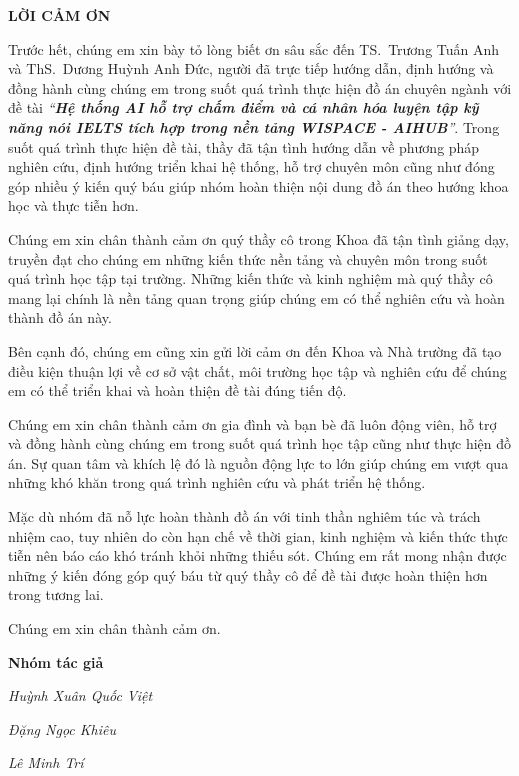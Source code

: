 \begin{center}
    \textbf{\Large LỜI CẢM ƠN}
\end{center}

Trước hết, chúng em xin bày tỏ lòng biết ơn sâu sắc đến TS.~Trương Tuấn Anh và ThS.~Dương Huỳnh Anh Đức, người đã trực tiếp hướng dẫn, định hướng và đồng hành cùng chúng em trong suốt quá trình thực hiện đồ án chuyên ngành với đề tài 
\textit{``\textbf{Hệ thống AI hỗ trợ chấm điểm và cá nhân hóa luyện tập kỹ năng nói IELTS tích hợp trong nền tảng WISPACE - AIHUB}''}. 
Trong suốt quá trình thực hiện đề tài, thầy đã tận tình hướng dẫn về phương pháp nghiên cứu, định hướng triển khai hệ thống, hỗ trợ chuyên môn cũng như đóng góp nhiều ý kiến quý báu giúp nhóm hoàn thiện nội dung đồ án theo hướng khoa học và thực tiễn hơn.

Chúng em xin chân thành cảm ơn quý thầy cô trong Khoa đã tận tình giảng dạy, truyền đạt cho chúng em những kiến thức nền tảng và chuyên môn trong suốt quá trình học tập tại trường. Những kiến thức và kinh nghiệm mà quý thầy cô mang lại chính là nền tảng quan trọng giúp chúng em có thể nghiên cứu và hoàn thành đồ án này.

Bên cạnh đó, chúng em cũng xin gửi lời cảm ơn đến Khoa và Nhà trường đã tạo điều kiện thuận lợi về cơ sở vật chất, môi trường học tập và nghiên cứu để chúng em có thể triển khai và hoàn thiện đề tài đúng tiến độ.

Chúng em xin chân thành cảm ơn gia đình và bạn bè đã luôn động viên, hỗ trợ và đồng hành cùng chúng em trong suốt quá trình học tập cũng như thực hiện đồ án. Sự quan tâm và khích lệ đó là nguồn động lực to lớn giúp chúng em vượt qua những khó khăn trong quá trình nghiên cứu và phát triển hệ thống.

Mặc dù nhóm đã nỗ lực hoàn thành đồ án với tinh thần nghiêm túc và trách nhiệm cao, tuy nhiên do còn hạn chế về thời gian, kinh nghiệm và kiến thức thực tiễn nên báo cáo khó tránh khỏi những thiếu sót. Chúng em rất mong nhận được những ý kiến đóng góp quý báu từ quý thầy cô để đề tài được hoàn thiện hơn trong tương lai.

Chúng em xin chân thành cảm ơn.

\vspace{1cm}

\par\hfill\textbf{Nhóm tác giả}

\par\hfill\textit{Huỳnh Xuân Quốc Việt}

\par\hfill\textit{Đặng Ngọc Khiêu}

\par\hfill\textit{Lê Minh Trí}
\newpage
